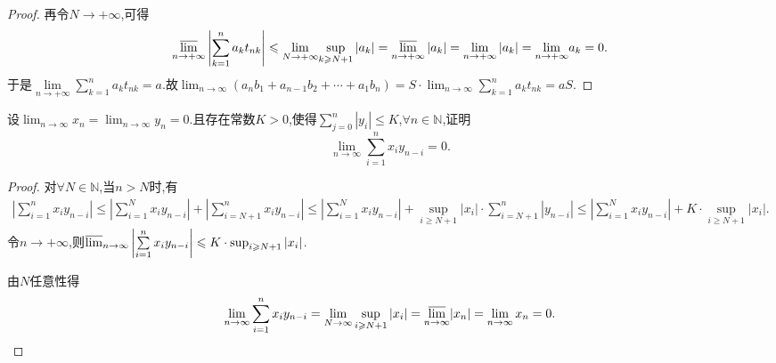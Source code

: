 \documentclass[../../main.tex]{subfiles}%
\begin{document}
\begin{proof}
再令$N\to +\infty$,可得
\begin{align*}
\underset{n\rightarrow +\infty}{{\varlimsup }}\left| \sum\limits_{k=1}^n{a_kt_{nk}} \right|\leqslant \underset{N\rightarrow +\infty}{\lim}\underset{k\geqslant N+1}{\mathrm{sup}}\left| a_k \right|=\underset{n\rightarrow +\infty}{{\varlimsup }}\left| a_k \right|=\underset{n\rightarrow +\infty}{\lim}\left| a_k \right|=\underset{n\rightarrow +\infty}{\lim}a_k=0.
\end{align*}
于是$\underset{n\rightarrow +\infty}{\lim}\sum\limits_{k=1}^n{a_kt_{nk}}=a$.故$\lim_{n\rightarrow \infty} \left( a_nb_1+a_{n-1}b_2+\cdots +a_1b_n \right) =S\cdot \lim_{n\rightarrow \infty} \sum\limits_{k=1}^n{a_kt_{nk}}=aS$.
\end{proof}

\begin{example}
设$\lim_{n \to \infty} x_n = \lim_{n \to \infty} y_n = 0.$且存在常数\(K > 0\),使得\(\sum\limits_{j = 0}^{n} |y_i| \leqslant  K\),\(\forall n \in \mathbb{N}\),证明
\[
\lim_{n \to \infty} \sum\limits_{i = 1}^{n} x_i y_{n - i} = 0.
\]
\end{example}
\begin{proof}
对\(\forall N\in \mathbb{N}\),当\(n > N\)时,有
\begin{align*}
\left|\sum\limits_{i = 1}^{n} x_i y_{n - i}\right| \leqslant  \left|\sum\limits_{i = 1}^{N} x_i y_{n - i}\right| + \left|\sum\limits_{i = N + 1}^{n} x_i y_{n - i}\right|
\leqslant  \left|\sum\limits_{i = 1}^{N} x_i y_{n - i}\right| + \sup_{i\geqslant  N + 1} |x_i| \cdot \sum\limits_{i = N + 1}^{n} |y_{n - i}|
\leqslant  \left|\sum\limits_{i = 1}^{N} x_i y_{n - i}\right| + K \cdot \sup_{i\geqslant  N + 1} |x_i|.
\end{align*}
令$n\to+\infty$,则\(\varlimsup_{n \to \infty} \left|\sum\limits_{i = 1}^{n} x_i y_{n - i}\right| \leqslant  K \cdot \sup_{i\geqslant  N + 1} |x_i|\).

由\(N\)任意性得
\begin{align*}
\lim_{n\rightarrow \infty} \sum\limits_{i=1}^n{x_iy_{n-i}}=\lim_{N\rightarrow \infty} \mathop {\mathrm{sup}} \limits_{i\geqslant N+1}|x_i|=\underset{n\rightarrow \infty}{{\varlimsup }}|x_n|=\lim_{n\rightarrow \infty} x_n=0.
\end{align*}
\end{proof}
\end{document}
